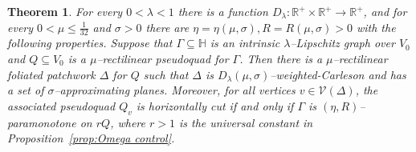 \documentclass[11pt,reqno]{amsart}
\renewcommand{\H}{\mathbb{H}}
\newcommand{\R}{\mathbb{R}}
\newcommand{\cV}{\mathcal{V}}
\newcommand{\0}{\mathbf{0}}
\renewcommand{\1}{\mathbf 1}
\newcommand{\from}{\colon}
\renewcommand{\subset}{\subseteq}
\renewcommand{\le}{\leqslant}
\newtheorem{thm}{Theorem}[section]
\theoremstyle{remark}
\begin{document}
\begin{thm}\label{thm:future-use}
  For every $0<\lambda<1$  there is a function $D_\lambda\from \R^+\times \R^+\to \R^+$, and for every $0<\mu \le\frac{1}{32}$ and $\sigma >0$ there are $\eta=\eta(\mu,\sigma),R=R(\mu,\sigma)>0$ with the following properties.  Suppose that $\Gamma\subset \H$  is an intrinsic $\lambda$--Lipschitz graph over $V_0$ and $Q\subset V_0$ is a $\mu$--rectilinear pseudoquad for $\Gamma$. Then there is a $\mu$--rectilinear foliated patchwork $\Delta$ for $Q$ such that $\Delta$ is $D_\lambda(\mu,\sigma)$--weighted-Carleson and has a set of $\sigma$--approximating planes. Moreover, for all vertices $v\in \cV(\Delta)$, the associated pseudoquad $Q_v$ is horizontally cut if and only if $\Gamma$ is $(\eta,R)$--paramonotone on $rQ$, where $r>1$ is the universal constant in Proposition~\ref{prop:Omega control}.
\end{thm}
\end{document}
